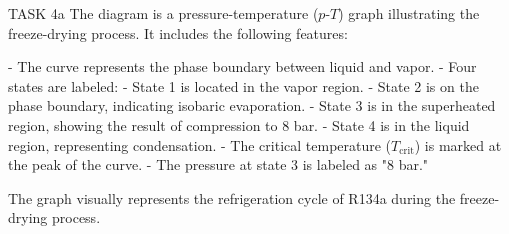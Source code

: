 TASK 4a  
The diagram is a pressure-temperature (\(p\)-\(T\)) graph illustrating the freeze-drying process. It includes the following features:  

- The curve represents the phase boundary between liquid and vapor.  
- Four states are labeled:  
  - State 1 is located in the vapor region.  
  - State 2 is on the phase boundary, indicating isobaric evaporation.  
  - State 3 is in the superheated region, showing the result of compression to 8 bar.  
  - State 4 is in the liquid region, representing condensation.  
- The critical temperature (\(T_{\text{crit}}\)) is marked at the peak of the curve.  
- The pressure at state 3 is labeled as "8 bar."  

The graph visually represents the refrigeration cycle of R134a during the freeze-drying process.
